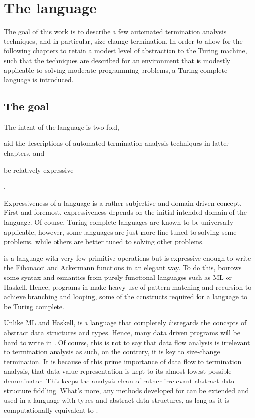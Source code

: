 \chapter{The language \D{}}\label{section:d}

The goal of this work is to describe a few automated termination analysis
techniques, and in particular, size-change termination. In order to allow for
the following chapters to retain a modest level of abstraction to the Turing
machine, such that the techniques are described for an environment that is
modestly applicable to solving moderate programming problems, a Turing complete
language \D{} is introduced.

\section{The goal}

The intent of the language is two-fold, \begin{inparaenum}[(1)]\item aid the
descriptions of automated termination analysis techniques in latter
chapters, and \item be relatively expressive\end{inparaenum}.

Expressiveness of a language is a rather subjective and domain-driven concept.
First and foremost, expressiveness depends on the initial intended domain of
the language. Of course, Turing complete languages are known to be universally
applicable, however, some languages are just more fine tuned to solving some
problems, while others are better tuned to solving other problems.

\D{} is a language with very few primitive operations but is expressive enough
to write the Fibonacci and Ackermann functions in an elegant way. To do this,
\D{} borrows some syntax and semantics from purely functional languages such as
ML or Haskell. Hence, programs in \D{} make heavy use of pattern matching and
recursion to achieve branching and looping, some of the constructs required for
a language to be Turing complete.

Unlike ML and Haskell, \D{} is a language that completely disregards the
concepts of abstract data structures and types. Hence, many data driven
programs will be hard to write in \D{}. Of course, this is not to say that data
flow analysis is irrelevant to termination analysis as such, on the contrary,
it is key to size-change termination. It is because of this prime importance of
data flow to termination analysis, that data value representation is kept to
its almost lowest possible denominator. This keeps the analysis clean of rather
irrelevant abstract data structure fiddling. What's more, any methods developed
for \D{} can be extended and used in a language with types and abstract data
structures, as long as it is computationally equivalent to \D{}.

